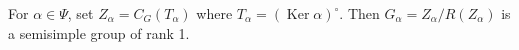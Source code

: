 For $\alpha \in \Psi$, set $Z_\alpha = C_G(T_\alpha)$ where $T_\alpha = (\operatorname{Ker} \alpha)^\circ$. Then $G_\alpha = Z_\alpha/R(Z_\alpha)$ is a semisimple group of rank 1.
